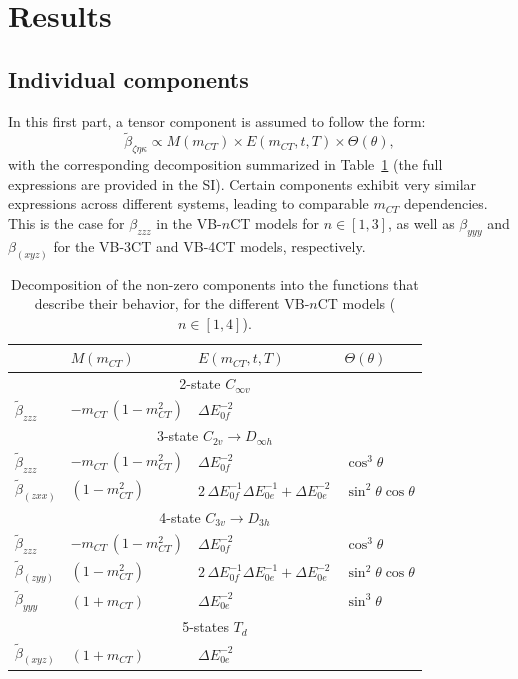 \documentclass[journal=jpcafh]{achemso}
\begin{document}
\section{Results}

\subsection{Individual components}

In this first part, a tensor component is assumed to follow the form:
\begin{equation*}
	\tilde \beta_{\zeta\eta\kappa} \propto M(m_{CT}) \times E(m_{CT},t,T) \times \Theta(\theta),
\end{equation*}
with the corresponding decomposition summarized in Table~\ref{tab:dec} (the full expressions are provided in the SI).
Certain components exhibit very similar expressions across different systems, leading to comparable $m_{CT}$ dependencies. This is the case for $\beta_{zzz}$ in the VB-$n$CT models for $n\in[1,3]$, as well as $\beta_{yyy}$ and $\beta_{(xyz)}$ for the VB-3CT and VB-4CT models, respectively. 

\begin{table}
	\centering
	\begin{tabular}{llll}
		\toprule
		&$M(m_{CT})$ & $E(m_{CT}, t, T)$ & $\Theta(\theta)$ \\
		\midrule
		\multicolumn{4}{c}{2-state $C_{\infty v}$} \\
		\midrule
		$\tilde\beta_{zzz}$ & $-m_{CT}\,(1-m_{CT}^2)$ & $\Delta E_{0f}^{-2}$ & \\
		\midrule
		\multicolumn{4}{c}{3-state $C_{2v}\rightarrow D_{\infty h}$}\\
		\midrule
		$\tilde\beta_{zzz}$ & $-m_{CT}\,(1-m_{CT}^2)$ & $\Delta E_{0f}^{-2}$ & $\cos^3\theta$ \\
		$\tilde\beta_{(zxx)}$ & $(1-m_{CT}^2)$ & $2\,\Delta E_{0f}^{-1}\Delta E_{0e}^{-1}+\Delta E_{0e}^{-2}$ & $\sin^2\theta\cos\theta$\\
		\midrule
		\multicolumn{4}{c}{4-state $C_{3v}\rightarrow D_{3h}$} \\
		\midrule
		$\tilde\beta_{zzz}$ & $-m_{CT}\,(1-m_{CT}^2)$ & $\Delta E_{0f}^{-2}$ & $\cos^3\theta$\\
		$\tilde\beta_{(zyy)}$ & $(1-m_{CT}^2)$ & $2\,\Delta E_{0f}^{-1}\Delta E_{0e}^{-1}+\Delta E_{0e}^{-2}$ & $\sin^2\theta\cos\theta$\\
		$\tilde\beta_{yyy}$ & $ (1+m_{CT})$ & $\Delta E_{0e}^{-2}$ & $\sin^3\theta$\\
		\midrule
		\multicolumn{4}{c}{5-states $T_d$} \\
		\midrule
		$\tilde\beta_{(xyz)}$ & $ (1+m_{CT})$ & $\Delta E_{0e}^{-2}$ & \\
		\bottomrule
	\end{tabular}
	\caption{Decomposition of the non-zero components into the functions that describe their behavior,  for the different VB-$n$CT models ($n\in[1,4]$).}
	\label{tab:dec}
\end{table}
\end{document}
